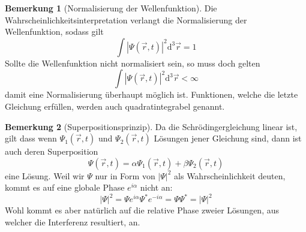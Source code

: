 \documentclass[oneside]{book}
\theoremstyle{definition}
\newtheorem*{bemerkung*}{Bemerkung}
\renewcommand{\d}{\mathrm d}
\begin{document}
\begin{bemerkung*}[Normalisierung der Wellenfunktion]
	Die Wahrscheinlichkeitsinterpretation verlangt die Normalisierung der Wellenfunktion, sodass gilt
	$$\int |\Psi(\vec{r}, t)|^2 \d^3 \vec{r} = 1$$
	Sollte die Wellenfunktion nicht normalisiert sein, so muss doch gelten
	$$\int |\Psi(\vec{r}, t)|^2 \d^3 \vec{r} < \infty$$
	damit eine Normalisierung überhaupt möglich ist. Funktionen, welche die letzte Gleichung erfüllen, werden auch quadratintegrabel genannt.
\end{bemerkung*}
\begin{bemerkung*}[Superpositionsprinzip]
	Da die Schrödingergleichung linear ist, gilt dass wenn $\Psi_1(\vec{r}, t)$ und $\Psi_2(\vec{r}, t)$ Lösungen jener Gleichung sind, dann ist auch deren Superposition
	$$\Psi(\vec{r}, t) = \alpha \Psi_1(\vec{r}, t) + \beta \Psi_2(\vec{r}, t)$$
	eine Lösung. Weil wir $\Psi$ nur in Form von $|\Psi|^2$ als Wahrscheinlichkeit deuten, kommt es auf eine globale Phase $e^{i\alpha}$ nicht an:
	$$|\Psi|^2 = \Psi e^{i\alpha} \Psi^\ast e^{-i\alpha} = \Psi \Psi^\ast = |\Psi|^2$$
	Wohl kommt es aber natürlich auf die relative Phase zweier Lösungen, aus welcher die Interferenz resultiert, an.
\end{bemerkung*}
\end{document}
